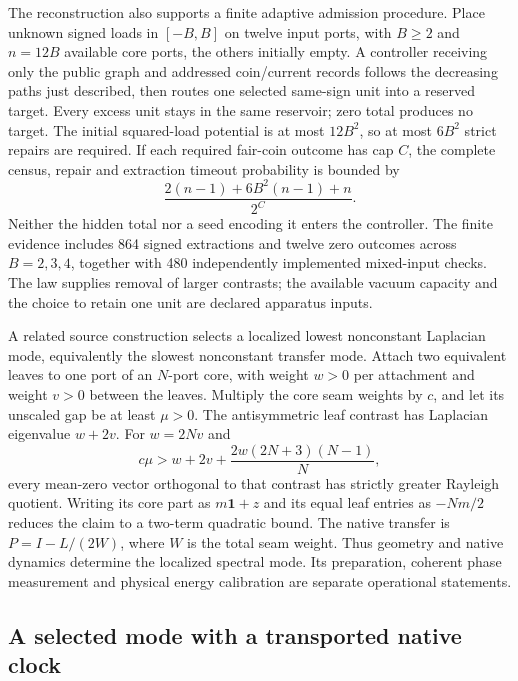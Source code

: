 The reconstruction also supports a finite adaptive admission procedure.
Place unknown signed loads in $[-B,B]$ on twelve input ports, with $B\geq2$
and $n=12B$ available core ports, the others initially empty. A controller
receiving only the public graph and addressed coin/current records follows the decreasing
paths just described, then routes one selected same-sign unit into a reserved
target. Every excess unit stays in the same reservoir; zero total produces
no target. The initial squared-load potential is at most $12B^2$, so at most
$6B^2$ strict repairs are required. If each required fair-coin outcome has
cap $C$, the complete census, repair and extraction timeout probability is
bounded by
\[
 \frac{2(n-1)+6B^2(n-1)+n}{2^C}.
\]
Neither the hidden total nor a seed encoding it enters the controller.
The finite evidence includes 864 signed extractions and twelve zero outcomes
across $B=2,3,4$, together with 480 independently implemented mixed-input
checks. The law supplies removal of larger contrasts; the available vacuum
capacity and the choice to retain one unit are declared apparatus inputs.

A related source construction selects a localized lowest nonconstant
Laplacian mode, equivalently the slowest nonconstant transfer mode. Attach two equivalent leaves to one port of an $N$-port
core, with weight $w>0$ per attachment and weight $v>0$ between the leaves.
Multiply the core seam weights by $c$, and let its unscaled gap be at least
$\mu>0$. The antisymmetric leaf contrast has Laplacian eigenvalue $w+2v$.
For $w=2Nv$ and
\[
 c\mu>w+2v+\frac{2w(2N+3)(N-1)}{N},
\]
every mean-zero vector orthogonal to that contrast has strictly greater
Rayleigh quotient. Writing its core part as $m\mathbf1+z$ and its equal
leaf entries as $-Nm/2$ reduces the claim to a two-term quadratic bound.
The native transfer is $P=I-L/(2W)$, where $W$ is the total seam weight.
Thus geometry and native dynamics determine the localized spectral mode.
Its preparation, coherent phase measurement and physical energy calibration
are separate operational statements.

\subsection{A selected mode with a transported native clock}
\label{subsec:selected-mode-native-clock}

